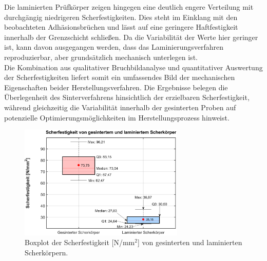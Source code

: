 Die laminierten Prüfkörper zeigen hingegen eine deutlich engere Verteilung mit durchgängig niedrigeren Scherfestigkeiten. Dies steht im Einklang mit den beobachteten Adhäsionsbrüchen und lässt auf eine geringere Haftfestigkeit innerhalb der Grenzschicht schließen. Da die Variabilität der Werte hier geringer ist, kann davon ausgegangen werden, dass das Laminierungsverfahren reproduzierbar, aber grundsätzlich mechanisch unterlegen ist.\\

Die Kombination aus qualitativer Bruchbildanalyse und quantitativer Auswertung der Scherfestigkeiten liefert somit ein umfassendes Bild der mechanischen Eigenschaften beider Herstellungsverfahren. Die Ergebnisse belegen die Überlegenheit des Sinterverfahrens hinsichtlich der erzielbaren Scherfestigkeit, während gleichzeitig die Variabilität innerhalb der gesinterten Proben auf potenzielle Optimierungsmöglichkeiten im Herstellungsprozess hinweist.

\begin{figure}[H]
    \centering
    \includegraphics[width=0.7\textwidth]{Bilder/boxplot_final.eps}
    \caption{Boxplot der Scherfestigkeit {[}N/mm$^2${]} von gesinterten und laminierten Scherkörpern.}
    \label{fig:boxplot}
\end{figure}




